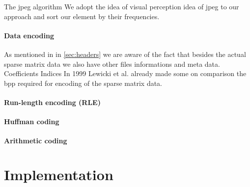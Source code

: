 
The jpeg algorithm 
We adopt the idea of visual perception idea of jpeg to our approach and sort our element by their frequencies.

\paragraph{Data encoding}
As mentioned in in \ref{sec:headers} we are aware of the fact that besides the actual sparse matrix data we also have other files informations and meta data.
Coefficients
Indices
In 1999 Lewicki et al. \cite{Lewicki1999} already made some on comparison the bpp required for encoding of the sparse matrix data.
\cite{Murray2006}

\paragraph{Run-length encoding (RLE)}
\paragraph{Huffman coding}
\paragraph{Arithmetic coding}




\section{Implementation}
%

